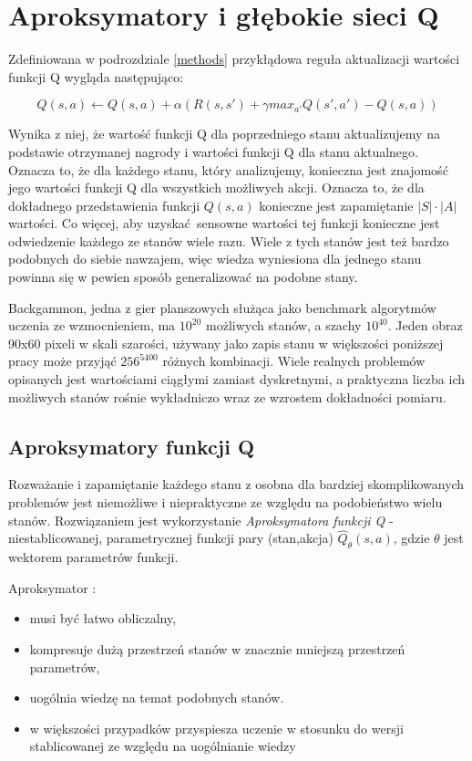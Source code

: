\section{Aproksymatory i głębokie sieci Q}

Zdefiniowana w podrozdziale \ref{methods} przykłądowa reguła aktualizacji wartości funkcji Q wygląda następująco:

$$Q(s,a) \leftarrow Q(s,a) + \alpha (R(s,s') + \gamma max_{a'}Q(s',a') - Q (s,a))$$

Wynika z niej, że wartość funkcji Q dla poprzedniego stanu aktualizujemy na podstawie otrzymanej nagrody i wartości funkcji Q dla stanu aktualnego. Oznacza to, że dla każdego stanu, który analizujemy, konieczna jest znajomość jego wartości funkcji Q dla wszystkich możliwych akcji. Oznacza to, że dla dokładnego przedstawienia funkcji $Q(s,a)$  konieczne jest zapamiętanie $\left\vert{S}\right\vert \cdot \left\vert{A}\right\vert$ wartości. Co więcej, aby uzyskać sensowne wartości tej funkcji konieczne jest odwiedzenie każdego ze stanów wiele razu. Wiele z tych stanów jest też bardzo podobnych do siebie nawzajem, więc wiedza wyniesiona dla jednego stanu powinna się w pewien sposób generalizować na podobne stany.

Backgammon, jedna z gier planszowych służąca jako benchmark algorytmów uczenia ze wzmocnieniem, ma $10^{20}$ możliwych stanów, a szachy $10^{40}$. Jeden obraz 90x60 pixeli w skali szarości, używany jako zapis stanu w większości poniższej pracy może przyjąć $256^{5400}$ różnych kombinacji. Wiele realnych problemów opisanych jest wartościami ciągłymi zamiast dyskretnymi, a praktyczna liczba ich możliwych stanów rośnie wykładniczo wraz ze wzrostem dokładności pomiaru.

\subsection{Aproksymatory funkcji Q}

Rozważanie i zapamiętanie każdego stanu z osobna dla bardziej skomplikowanych problemów jest niemożliwe i niepraktyczne ze względu na podobieństwo wielu stanów. Rozwiązaniem jest wykorzystanie \textit {Aproksymatora funkcji Q} - niestablicowanej, parametrycznej funkcji pary (stan,akcja) $\hat{Q}_{\theta}(s,a)$, gdzie $\theta$ jest wektorem parametrów funkcji.


Aproksymator \cite{wjaskowski2016}:
\begin{itemize}
\item musi być łatwo obliczalny,
\item kompresuje dużą przestrzeń stanów w znacznie mniejszą przestrzeń parametrów,
\item uogólnia wiedzę na temat podobnych stanów.
\item w większości przypadków przyspiesza uczenie w stosunku do wersji stablicowanej ze względu na uogólnianie wiedzy
\end{itemize}

